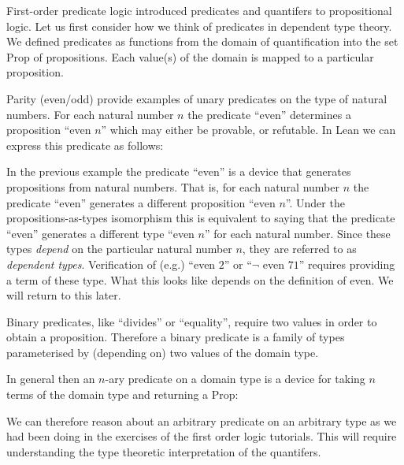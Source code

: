 \documentclass{book}
\begin{document}
    First-order predicate logic introduced predicates and quantifers to propositional logic. Let us first consider how we think of predicates in dependent type theory. We defined predicates as functions from the domain of quantification into the set Prop of propositions. Each value(s) of the domain is mapped to a particular proposition. 

    \begin{eg}
        Parity (even/odd) provide examples of unary predicates on the type of natural numbers. For each natural number $n$ the predicate ``even'' determines a proposition ``even $n$'' which may either be provable, or refutable. In Lean we can express this predicate as follows:         
    \end{eg}

    In the previous example the predicate ``even'' is a device that generates propositions from natural numbers. That is, for each natural number $n$ the predicate ``even'' generates a different proposition ``even $n$''. Under the propositions-as-types isomorphism this is equivalent to saying that the predicate ``even'' generates a different type ``even $n$'' for each natural number. Since these types \emph{depend} on the particular natural number $n$, they are referred to as \emph{dependent types}. Verification of (e.g.) ``even $2$'' or ``$\lnot$ even $71$'' requires providing a term of these type. What this looks like depends on the definition of even. We will return to this later. 

    \begin{eg}
        Binary predicates, like ``divides'' or ``equality'', require two values in order to obtain a proposition. Therefore a binary predicate is a family of types parameterised by (depending on) two values of the domain type. 


    \end{eg}

    In general then an $n$-ary predicate on a domain type is a device for taking $n$ terms of the domain type and returning a Prop: 


    We can therefore reason about an arbitrary predicate on an arbitrary type as we had been doing in the exercises of the first order logic tutorials. This will require understanding the type theoretic interpretation of the quantifers. 
    
\end{document}
